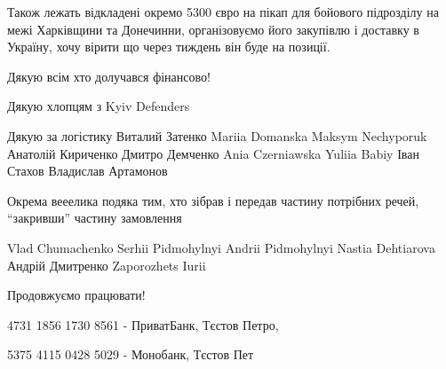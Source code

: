Також лежать відкладені окремо 5300 євро на пікап для бойового підрозділу на
межі Харківщини та Донечинни, організовуємо його закупівлю і доставку в
Україну, хочу вірити що через тиждень він буде на позиції. 

Дякую всім хто долучався фінансово!

Дякую хлопцям з Kyiv Defenders 

Дякую за логістику Виталий Затенко Mariia Domanska Maksym Nechyporuk Анатолій
Кириченко  Дмитро Демченко Ania Czerniawska Yuliia Babiy Іван Стахов Владислав
Артамонов

Окрема вееелика подяка тим, хто зібрав і передав частину потрібних речей,
\enquote{закривши} частину замовлення 

Vlad  Chumachenko Serhii Pidmohylnyi Andrii Pidmohylnyi Nastia Dehtiarova
Андрій Дмитренко Zaporozhets Iurii

Продовжуємо працювати! 

4731 1856 1730 8561 - ПриватБанк, Тєстов Петро, 

5375 4115 0428 5029 - Монобанк, Тєстов Пет
